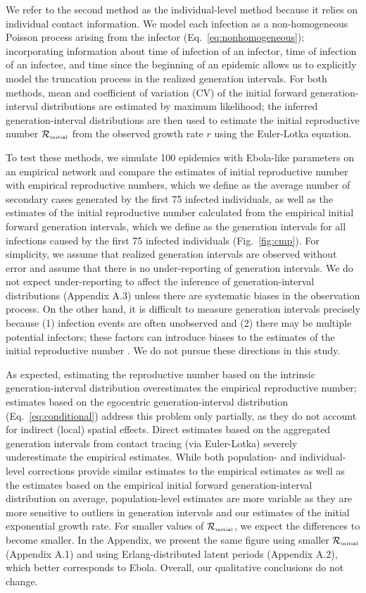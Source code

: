 \documentclass[12pt]{article}
\newcommand{\eref}[1]{Eq.~\ref{eq:#1}}
\newcommand{\fref}[1]{Fig.~\ref{fig:#1}}
\newcommand{\Rx}[1]{\ensuremath{{\mathcal R}_{#1}}\xspace}
\newcommand{\Rini}{\Rx{\textrm{\tiny initial}}}
\begin{document}
We refer to the second method as the individual-level method because it relies on individual contact information.
We model each infection as a non-homogeneous Poisson process arising from the infector (\eref{nonhomogeneous}); 
incorporating information about time of infection of an infector, time of infection of an infectee, and time since the beginning of an epidemic allows us to explicitly model the truncation process in the realized generation intervals.
For both methods, mean and coefficient of variation (CV) of the initial forward generation-interval distributions are estimated by maximum likelihood; the inferred generation-interval distributions are then used to estimate the initial reproductive number $\Rini$ from the observed growth rate $r$ using the Euler-Lotka equation.

To test these methods, we simulate 100 epidemics with Ebola-like parameters on an empirical network \citep{leskovec2016snap}
and compare the estimates of initial reproductive number with empirical reproductive numbers, which we define as the average number of secondary cases generated by the first 75 infected individuals,
as well as the estimates of the initial reproductive number calculated from the empirical initial forward generation intervals, which we define as the generation intervals for all infections caused by the first 75 infected individuals (\fref{cmp}).
For simplicity, we assume that realized generation intervals are observed without error and assume that there is no under-reporting of generation intervals.
We do not expect under-reporting to affect the inference of generation-interval distributions (Appendix A.3) unless there are systematic biases in the observation process.
On the other hand, it is difficult to measure generation intervals precisely because (1) infection events are often unobserved and (2) there may be multiple potential infectors; these factors can introduce biases to the estimates of the initial reproductive number \cite{britton2019estimation}.
We do not pursue these directions in this study.

As expected, estimating the reproductive number based on the intrinsic generation-interval distribution overestimates the empirical reproductive number;
estimates based on the egocentric generation-interval distribution (\eref{conditional}) address this problem only partially, as they do not account for indirect (local) spatial effects. 
Direct estimates based on the aggregated generation intervals from contact tracing (via Euler-Lotka) severely underestimate the empirical estimates.
While both population- and individual-level corrections provide similar estimates to the empirical estimates as well as the estimates based on the empirical initial forward generation-interval distribution on average,
population-level estimates are more variable as they are more sensitive to outliers in generation intervals and our estimates of the initial exponential growth rate.
For smaller values of $\Rini$, we expect the differences to become smaller.
In the Appendix, we present the same figure using smaller $\Rini$ (Appendix A.1) and using Erlang-distributed latent periods (Appendix A.2), which better corresponds to Ebola.
Overall, our qualitative conclusions do not change.
\end{document}
